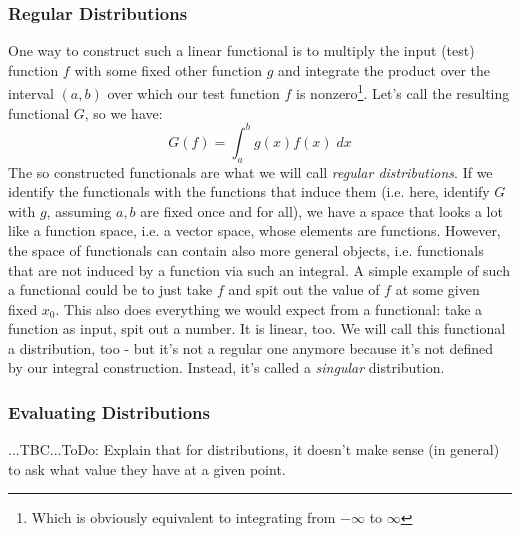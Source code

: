 \subsubsection{Regular Distributions}
One way to construct such a linear functional is to multiply the input (test) function $f$ with some fixed other function $g$ and integrate the product over the interval $(a,b)$ over which our test function $f$ is nonzero\footnote{Which is obviously equivalent to integrating from $-\infty$ to $\infty$}. Let's call the resulting functional $G$, so we have:
\begin{equation}
 G(f) = \int_a^b g(x) f(x) \; dx
\end{equation}
The so constructed functionals are what we will call \emph{regular distributions}. If we identify the functionals with the functions that induce them (i.e. here, identify $G$ with $g$, assuming $a,b$ are fixed once and for all), we have a space that looks a lot like a function space, i.e. a vector space, whose elements are functions. However, the space of functionals can contain also more general objects, i.e. functionals that are not induced by a function via such an integral. A simple example of such a functional could be to just take $f$ and spit out the value of $f$ at some given fixed $x_0$. This also does everything we would expect from a functional: take a function as input, spit out a number. It is linear, too. We will call this functional a distribution, too - but it's not a regular one anymore because it's not defined by our integral construction. Instead, it's called a \emph{singular} distribution.




\subsubsection{Evaluating Distributions} ...TBC...ToDo: Explain that for distributions, it doesn't make sense (in general) to ask what value they have at a given point. 

